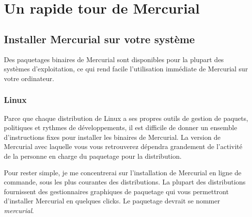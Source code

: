 \chapter{Un rapide tour de Mercurial}
\label{chap:tour-basic}

\section{Installer Mercurial sur votre système}
\label{sec:tour:install}

Des paquetages binaires de Mercurial sont disponibles pour la plupart
des systèmes d'exploitation, ce qui rend facile l'utilisation immédiate
de Mercurial sur votre ordinateur.

\subsection{Linux}

Parce que chaque distribution de Linux a ses propres outils de gestion
de paquets, politiques et rythmes de développements, il est difficile de
donner un ensemble d'instructions fixes pour installer les binaires de
Mercurial. La version de Mercurial avec laquelle vous vous retrouverez
dépendra grandement de l'activité de la personne en charge du paquetage
pour la distribution.

Pour rester simple, je me concentrerai sur l'installation de Mercurial
en ligne de commande, sous les plus courantes des distributions. La 
plupart des distributions fournissent des gestionnaires graphiques de
paquetage qui vous permettront d'installer Mercurial en quelques clicks.
Le paquetage devrait se nommer \textit{mercurial}.

